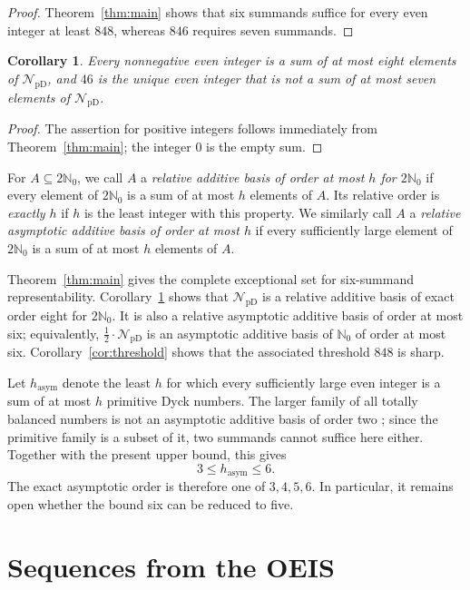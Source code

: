 \documentclass[12pt]{article}
\theoremstyle{plain}
\newtheorem{corollary}[theorem]{Corollary}
\newcommand{\NpD}{\mathcal{N}_{\mathrm{pD}}}
\begin{document}
\begin{proof}
Theorem~\ref{thm:main} shows that six summands suffice for every even
integer at least $848$, whereas $846$ requires seven summands.
\end{proof}

\begin{corollary}\label{cor:eight}
Every nonnegative even integer is a sum of at most eight elements of
$\NpD$, and $46$ is the unique even integer that is not a sum of at most
seven elements of $\NpD$.
\end{corollary}

\begin{proof}
The assertion for positive integers follows immediately from
Theorem~\ref{thm:main}; the integer $0$ is the empty sum.
\end{proof}

For $A\subseteq2\mathbb N_0$, we call $A$ a \emph{relative additive
basis of order at most $h$ for $2\mathbb N_0$} if every element of
$2\mathbb N_0$ is a sum of at most $h$ elements of $A$.  Its relative
order is \emph{exactly $h$} if $h$ is the least integer with this
property.  We similarly call $A$ a \emph{relative asymptotic additive
basis of order at most $h$} if every sufficiently large element of
$2\mathbb N_0$ is a sum of at most $h$ elements of $A$.

Theorem~\ref{thm:main} gives the complete exceptional set for
six-summand representability.  Corollary~\ref{cor:eight} shows that
$\NpD$ is a relative additive basis of exact order eight for
$2\mathbb N_0$.  It is also a relative asymptotic additive basis of
order at most six; equivalently, $\frac12\cdot\NpD$ is an asymptotic additive
basis of $\mathbb N_0$ of order at most six.  Corollary~\ref{cor:threshold}
shows that the associated threshold $848$ is sharp.

Let $h_{\mathrm{asym}}$ denote the least $h$ for which every sufficiently
large even integer is a sum of at most $h$ primitive Dyck numbers.  The
larger family of all totally balanced numbers is not an asymptotic
additive basis of order two \cite[Thm.~14]{BLS}; since the primitive
family is a subset of it, two summands cannot suffice here either.
Together with the present upper bound, this gives
\[
        3\leq h_{\mathrm{asym}}\leq6.
\]
The exact asymptotic order is therefore one of $3,4,5,6$.  In particular,
it remains open whether the bound six can be reduced to five.


\section{Sequences from the OEIS}\label{sec:oeis}
\end{document}
